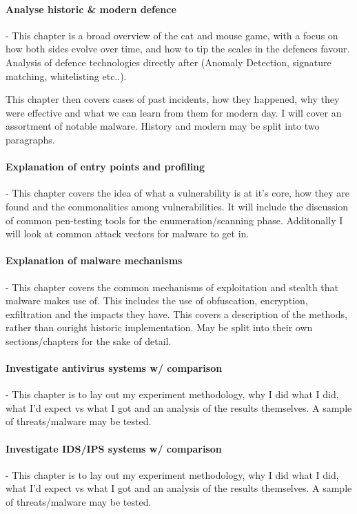 \paragraph{Analyse historic \& modern defence} - This chapter is a broad overview of the cat and mouse game, with a focus on how both sides evolve over time, 
and how to tip the scales in the defences favour. Analysis of defence technologies directly after (Anomaly Detection, signature matching, whitelisting etc..). 

This chapter then covers cases of past incidents, how they happened, why they were effective and what we can learn from them for modern day. 
I will cover an assortment of notable malware. History and modern may be split into two paragraphs.

\paragraph{Explanation of entry points and profiling} - This chapter covers the idea of what a vulnerability is at it's core, how they are found
and the commonalities among vulnerabilities. It will include the discussion of common pen-testing tools for the enumeration/scanning phase.
Additonally I will look at common attack vectors for malware to get in.

\paragraph{Explanation of malware mechanisms} - This chapter covers the common mechanisms of exploitation and stealth that malware makes use of. 
This includes the use of obfuscation, encryption, exfiltration and the impacts they have. This covers a description of the methods, rather than ouright historic implementation.
May be split into their own sections/chapters for the sake of detail.


\paragraph{Investigate antivirus systems w/ comparison} - This chapter is to lay out my experiment methodology, why I did what I did, what I'd expect vs what I got and an analysis of the results themselves.  A sample of threats/malware may be tested.

\paragraph{Investigate IDS/IPS systems w/ comparison} - This chapter is to lay out my experiment methodology, why I did what I did, what I'd expect vs what I got and an analysis of the results themselves. A sample of threats/malware may be tested.

